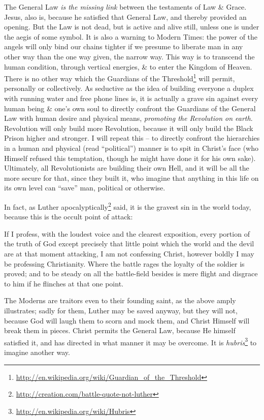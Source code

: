 The General Law \emph{is the missing link} between the testaments of Law \& Grace. Jesus, also is, because he satisfied that General Law, and thereby provided an opening. But the Law is not dead, but is active and alive still, unless one is under the aegis of some symbol. It is also a warning to Modern Times: the power of the angels will only bind our chains tighter if we presume to liberate man in any other way than the one way given, the narrow way. This way is to transcend the human condition, through vertical energies, \& to enter the Kingdom of Heaven. There is no other way which the Guardians of the Threshold\footnote{\url{http://en.wikipedia.org/wiki/Guardian\_of\_the\_Threshold}} will permit, personally or collectively. As seductive as the idea of building everyone a duplex with running water and free phone lines is, it is actually a grave sin against every human being \& one's own soul to directly confront the Guardians of the General Law with human desire and physical means, \emph{promoting the Revolution on earth}. Revolution will only build more Revolution, because it will only build the Black Prison higher and stronger. I will repeat this -- to directly confront the hierarchies in a human and physical (read ``political'') manner is to spit in Christ's face (who Himself refused this temptation, though he might have done it for his own sake). Ultimately, all Revolutionists are building their own Hell, and it will be all the more secure for that, since they built it, who imagine that anything in this life on its own level can ``save'' man, political or otherwise.

In fact, as Luther apocalyptically\footnote{\url{http://creation.com/battle-quote-not-luther}} said, it is the gravest sin in the world today, because this is the occult point of attack:

\begin{quotex}
If I profess, with the loudest voice and the clearest exposition, every portion of the truth of God except precisely that little point which the world and the devil are at that moment attacking, I am not confessing Christ, however boldly I may be professing Christianity. Where the battle rages the loyalty of the soldier is proved; and to be steady on all the battle-field besides is mere flight and disgrace to him if he flinches at that one point.
\end{quotex}


The Moderns are traitors even to their founding saint, as the above amply illustrates; sadly for them, Luther may be saved anyway, but they will not, because God will laugh them to scorn and mock them, and Christ Himself will break them in pieces. Christ permits the General Law, because He himself satisfied it, and has directed in what manner it may be overcome. It is \emph{hubris}\footnote{\url{http://en.wikipedia.org/wiki/Hubris}} to imagine another way.

